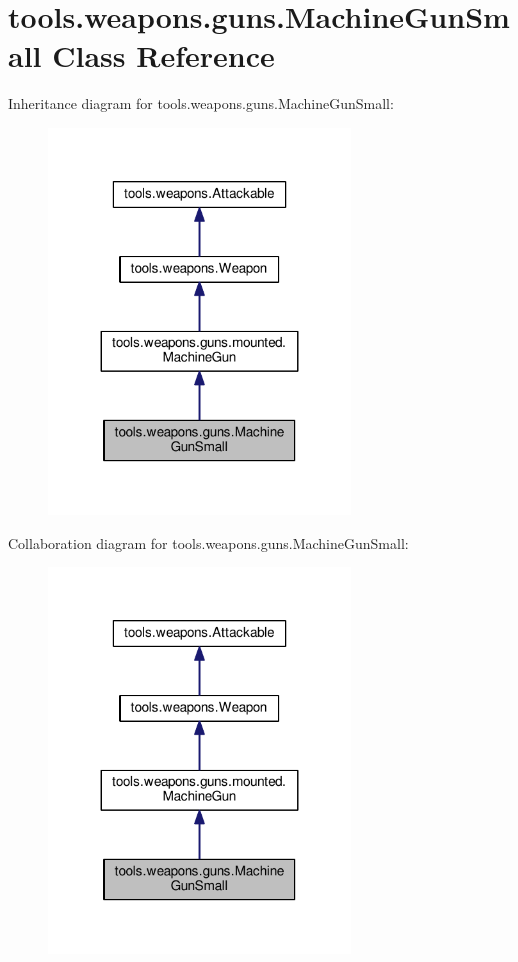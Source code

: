 \hypertarget{classtools_1_1weapons_1_1guns_1_1_machine_gun_small}{}\section{tools.\+weapons.\+guns.\+Machine\+Gun\+Small Class Reference}
\label{classtools_1_1weapons_1_1guns_1_1_machine_gun_small}


Inheritance diagram for tools.\+weapons.\+guns.\+Machine\+Gun\+Small\+:\nopagebreak
\begin{figure}[H]
\begin{center}
\leavevmode
\includegraphics[width=227pt]{classtools_1_1weapons_1_1guns_1_1_machine_gun_small__inherit__graph}
\end{center}
\end{figure}


Collaboration diagram for tools.\+weapons.\+guns.\+Machine\+Gun\+Small\+:\nopagebreak
\begin{figure}[H]
\begin{center}
\leavevmode
\includegraphics[width=227pt]{classtools_1_1weapons_1_1guns_1_1_machine_gun_small__coll__graph}
\end{center}
\end{figure}
